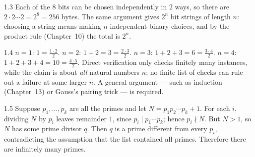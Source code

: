 \begin{solution}{1.3}
Each of the $8$ bits can be chosen independently in $2$ ways, so there are
$2 \cdot 2 \cdots 2 = 2^8 = 256$ bytes. The same argument gives $2^n$ bit
strings of length $n$: choosing a string means making $n$ independent binary
choices, and by the product rule (Chapter~10) the total is $2^n$.
\end{solution}

\begin{solution}{1.4}
$n=1$: $1 = \frac{1\cdot 2}{2}$. $n=2$: $1+2 = 3 = \frac{2\cdot 3}{2}$.
$n=3$: $1+2+3=6=\frac{3\cdot4}{2}$. $n=4$: $1+2+3+4=10=\frac{4\cdot5}{2}$.
Direct verification only checks finitely many instances, while the claim is
about \emph{all} natural numbers $n$; no finite list of checks can rule out a
failure at some larger $n$. A general argument --- such as induction
(Chapter~13) or Gauss's pairing trick --- is required.
\end{solution}

\begin{solution}{1.5}
Suppose $p_1,\dots,p_k$ are all the primes and let
$N = p_1p_2\cdots p_k + 1$. For each $i$, dividing $N$ by $p_i$ leaves
remainder $1$, since $p_i \mid p_1\cdots p_k$; hence $p_i \nmid N$. But
$N > 1$, so $N$ has some prime divisor $q$. Then $q$ is a prime different from
every $p_i$, contradicting the assumption that the list contained all primes.
Therefore there are infinitely many primes.
\end{solution}
